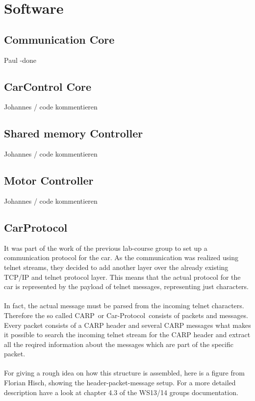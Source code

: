 \chapter{Software}

\section{Communication Core}
Paul -done

\section{CarControl Core}
Johannes / code kommentieren

\section{Shared memory Controller}
Johannes / code kommentieren

\section{Motor Controller}
Johannes / code kommentieren

\section{CarProtocol}
It was part of the work of the previous lab-course group to set up a communication protocol for the car. As the communication was realized using telnet streams, they decided to add another layer over the already existing TCP/IP and telnet protocol layer. This means that the actual protocol for the car is represented by the payload of telnet messages, representing just characters.
\\ \\
In fact, the actual message must be parsed from the incoming telnet  characters. Therefore the so called \glqq CARP\grqq \ or \glqq Car-Protocol\grqq \ consists of packets and messages. Every packet consists of a CARP header and several CARP messages what makes it possible to search the incoming telnet stream for the CARP header and extract all the reqired information about the messages which are part of the specific packet.
\\ \\
For giving a rough idea on how this structure is assembled, here is a figure from Florian Hisch, showing the header-packet-message setup. For a more detailed description have a look at chapter 4.3 of the WS13/14 groups documentation.

